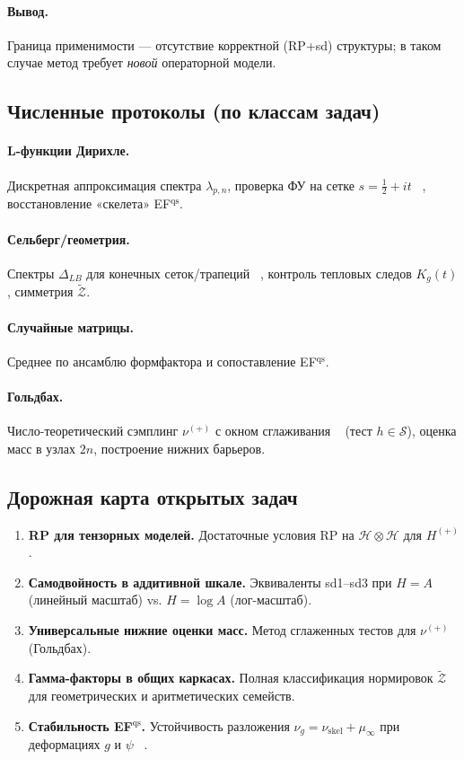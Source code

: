 \documentclass{article}
\numberwithin{equation}{section}
\theoremstyle{plain}
\theoremstyle{definition}
\theoremstyle{remark}
\def\infty{∞}\def\partial{∂}\def\sum{Σ}\def\int{∫}%
\begin{document}
\paragraph{Вывод.}
Граница применимости — отсутствие корректной (RP+sd) структуры; в таком случае метод требует \emph{новой} операторной модели.

\subsection*{Численные протоколы (по классам задач)}
\paragraph{L-функции Дирихле.}
Дискретная аппроксимация спектра \(\lambda_{p,n}\), проверка ФУ на сетке \(s=\tfrac12+it\) ~\cite{Odlyzko1987, Gourdon2004}, восстановление «скелета» EF\(^{\mathrm{qs}}\).
\paragraph{Сельберг/геометрия.}
Спектры \(\Delta_{LB}\) для конечных сеток/трапеций ~\cite{Trefethen2000}, контроль тепловых следов \(K_g(t)\), симметрия \(\widetilde{\mathcal Z}\).
\paragraph{Случайные матрицы.}
Среднее по ансамблю формфактора и сопоставление EF\(^{\mathrm{qs}}\).
\paragraph{Гольдбах.}
Число-теоретический сэмплинг \(\nu^{(+)}\) с окном сглаживания ~\cite{Press2007, DavisRabinowitz1984} (тест \(h\in\mathcal S\)), оценка масс в узлах \(2n\), построение нижних барьеров.

\subsection*{Дорожная карта открытых задач}
\begin{enumerate}
\item \textbf{RP для тензорных моделей.} Достаточные условия RP на \(\mathcal H\otimes\mathcal H\) для \(H^{(+)}\).
\item \textbf{Самодвойность в аддитивной шкале.} Эквиваленты sd1–sd3 при \(H=A\) (линейный масштаб) vs. \(H=\log A\) (лог-масштаб).
\item \textbf{Универсальные нижние оценки масс.} Метод сглаженных тестов для \(\nu^{(+)}\) (Гольдбах).
\item \textbf{Гамма-факторы в общих каркасах.} Полная классификация нормировок \(\widetilde{\mathcal Z}\) для геометрических и аритметических семейств.
\item \textbf{Стабильность EF\(^{\mathrm{qs}}\).} Устойчивость разложения \(\nu_g=\nu_{\mathrm{skel}}+\mu_\infty\) при деформациях \(g\) и \(\psi\) ~\cite{Kato1995}.
\end{enumerate}
\end{document}
